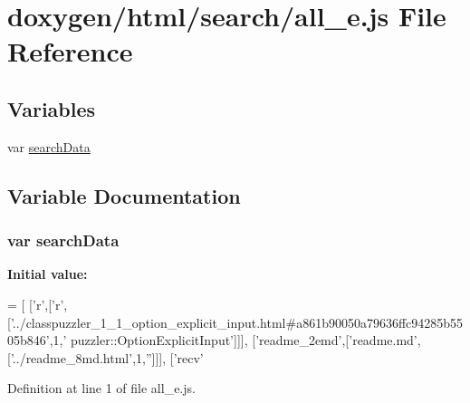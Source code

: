\hypertarget{a00059}{}\section{doxygen/html/search/all\+\_\+e.js File Reference}
\label{a00059}
\subsection*{Variables}
\begin{DoxyCompactItemize}
\item 
var \hyperlink{a00059_ad01a7523f103d6242ef9b0451861231e}{search\+Data}
\end{DoxyCompactItemize}


\subsection{Variable Documentation}
\hypertarget{a00059_ad01a7523f103d6242ef9b0451861231e}{}
\subsubsection[{search\+Data}]{\setlength{\rightskip}{0pt plus 5cm}var search\+Data}\label{a00059_ad01a7523f103d6242ef9b0451861231e}
{\bfseries Initial value\+:}
\begin{DoxyCode}
=
[
  [\textcolor{charliteral}{'r'},[\textcolor{charliteral}{'r'},[\textcolor{stringliteral}{'../classpuzzler\_1\_1\_option\_explicit\_input.html#a861b90050a79636ffc94285b5505b846'},1,\textcolor{stringliteral}{'
      puzzler::OptionExplicitInput'}]]],
  [\textcolor{stringliteral}{'readme\_2emd'},[\textcolor{stringliteral}{'readme.md'},[\textcolor{stringliteral}{'../readme\_8md.html'},1,\textcolor{stringliteral}{''}]]],
  [\textcolor{stringliteral}{'recv'}
\end{DoxyCode}


Definition at line 1 of file all\+\_\+e.\+js.

